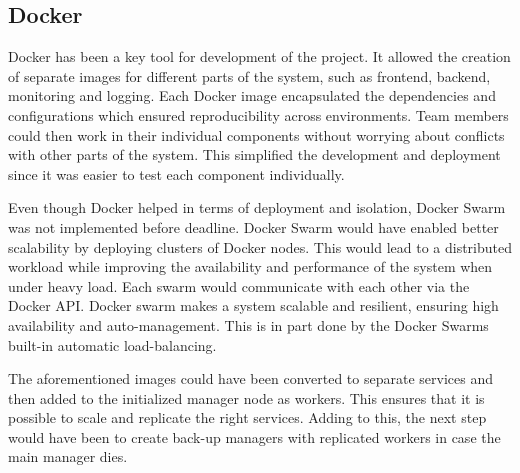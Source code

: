 \subsection{Docker}
Docker has been a key tool for development of the project. It allowed the creation of separate images for different parts of the system, such as frontend, backend, monitoring and logging. Each Docker image encapsulated the dependencies and configurations which ensured reproducibility across environments. Team members could then work in their individual components without worrying about conflicts with other parts of the system. This simplified the development and deployment since it was easier to test each component individually.

Even though Docker helped in terms of deployment and isolation, Docker Swarm was not implemented before deadline. Docker Swarm would have enabled better scalability by deploying clusters of Docker nodes. This would lead to a distributed workload while improving the availability and performance of the system when under heavy load. Each swarm would communicate with each other via the Docker API. Docker swarm makes a system scalable and resilient, ensuring high availability and auto-management. This is in part done by the Docker Swarms built-in automatic load-balancing.

The aforementioned images could have been converted to separate services and then added to the initialized manager node as workers. This ensures that it is possible to scale and replicate the right services. Adding to this, the next step would have been to create back-up managers with replicated workers in case the main manager dies.
